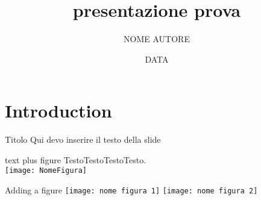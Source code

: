 \documentclass{beamer}
\title{presentazione prova}
\author{NOME AUTORE}
\date{DATA}
\begin{document}
\maketitle

\section{Introduction}
\begin{frame}{Titolo}
Qui devo inserire il testo della slide
\end{frame}

\begin{frame}{text plus figure}
\centering
 TestoTestoTestoTesto.\\
\smallskip
\texttt{[image: NomeFigura]} 
\end{frame}

\begin{frame}{Adding a figure}
\centering
 \texttt{[image: nome figura 1]}
 \texttt{[image: nome figura 2]}
\end{frame}
\end{document}
